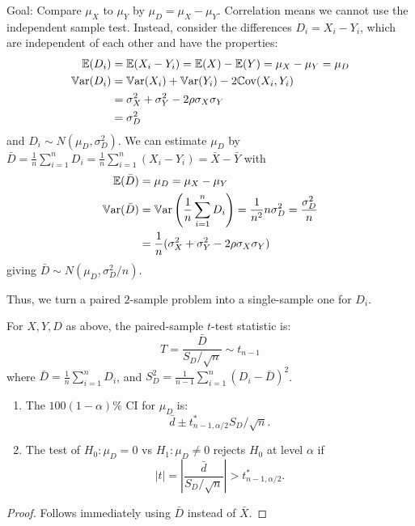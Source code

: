 \documentclass[10pt, a4paper]{article}
\begin{document}
Goal:
Compare $\mu_{X}$ to $\mu_{Y}$ by $\mu_{D} = \mu_{X} - \mu_{Y}$.
Correlation means we cannot use the independent sample test.
Instead,
consider the differences $D_i = X_i - Y_i$,
which are independent of each other and have the properties:
\begin{align*}
    \mathbb{E}(D_i) &= \mathbb{E}(X_i - Y_i) = \mathbb{E}(X) - \mathbb{E}(Y) = \mu_{X} - \mu_{Y} = \mu_{D} \\
    \mathbb{V}\mathrm{ar}(D_i) &= \mathbb{V}\mathrm{ar}(X_i) + \mathbb{V}\mathrm{ar}(Y_i) - 2\mathbb{C}\mathrm{ov}(X_i, Y_i) \\
    &= \sigma_{X} ^ 2 + \sigma_{Y} ^ 2 - 2\rho\sigma_{X}\sigma_{Y} \\
    &= \sigma_{D} ^ 2
\end{align*}
and $D_i \sim N(\mu_{D}, \sigma_{D} ^ 2)$.
We can estimate $\mu_{D}$ by $\bar{D} = \frac{1}{n}\sum_{i = 1}^{n}D_i = \frac{1}{n}\sum_{i = 1}^{n}(X_i - Y_i) = \bar{X} - \bar{Y}$ with
\begin{align*}
    \mathbb{E}(\bar{D}) &= \mu_{D} = \mu_{X} - \mu_{Y} \\
    \mathbb{V}\mathrm{ar}(\bar{D}) &= \mathbb{V}\mathrm{ar}\left(\frac{1}{n}\sum_{i = 1}^{n}D_i\right) = \frac{1}{n ^ 2}n\sigma_{D} ^ 2 = \frac{\sigma_{D} ^ 2}{n} \\
    &= \frac{1}{n}(\sigma_{X} ^ 2 + \sigma_{Y} ^ 2 - 2\rho\sigma_{X}\sigma_{Y})
\end{align*}
giving $\bar{D} \sim N(\mu_{D}, \sigma_{D} ^ 2 / n)$.

Thus,
we turn a paired $2$-sample problem into a single-sample one for $D_i$.

\begin{proposition}
    For $X, Y, D$ as above,
    the paired-sample $t$-test statistic is:
    \[
    T = \frac{\bar{D}}{S_{D} / \sqrt{n}} \sim t_{n - 1}
    \]
    where $\bar{D} = \frac{1}{n}\sum_{i = 1}^{n}D_i$,
    and $S_{D} ^ 2 = \frac{1}{n - 1}\sum_{i = 1}^{n}(D_i - \bar{D}) ^ 2$.

    \begin{enumerate}[label = (\roman*)]
        \item The $100(1 - \alpha)\%$ CI for $\mu_{D}$ is:
        \[
        \bar{d} \pm t_{n - 1, \alpha / 2}^{*}S_{D} / \sqrt{n}.
        \]

        \item The test of $H_0 : \mu_{D} = 0$ vs $H_1 : \mu_{D} \neq 0$ rejects $H_0$ at level $\alpha$ if
        \[
        |t| = \left|\frac{\bar{d}}{S_{D} / \sqrt{n}}\right| > t_{n - 1, \alpha / 2}^{*}.
        \]
    \end{enumerate}

    \begin{proof}
        Follows immediately using $\bar{D}$ instead of $\bar{X}$.
    \end{proof}
\end{proposition}
\end{document}
